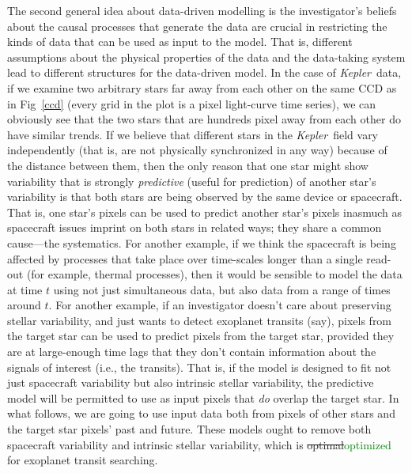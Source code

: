 \documentclass[12pt, preprint]{aastex}
\newcommand{\project}[1]{\textsl{#1}}
\newcommand{\Kepler}{\project{Kepler}}
\newcommand{\revise}[1]{\textcolor{green}{#1}}
\newcommand{\remove}[1]{\sout{#1}}
\begin{document}
The second general idea about data-driven modelling is the investigator's beliefs about the causal processes that generate the data are crucial in restricting the kinds of data that can be used as input to the model.
That is, different assumptions about the physical properties of the data and the data-taking system lead to different structures for the data-driven model.
In the case of \Kepler\ data, 
  if we examine two arbitrary stars far away from each other 
  on the same CCD as in Fig~\ref{ccd} (every grid in the plot is a pixel light-curve time series), 
  we can obviously see that the two stars that are hundreds pixel away from each other do have similar trends. 
  If we believe that different stars in the \Kepler\ field vary independently 
  (that is, are not physically synchronized in any way) because of the distance between them, 
  then the only reason that one star might show variability that is strongly \emph{predictive} (useful for prediction) of another star's variability
  is that both stars are being observed by the same device or spacecraft.
That is, one star's pixels can be used to predict another star's pixels inasmuch as spacecraft issues imprint on both stars in related ways;
  they share a common cause---the systematics.  
For another example, if we think the spacecraft is being affected by
  processes that take place over time-scales longer than a single read-out
  (for example, thermal processes),
  then it would be sensible to model the data at time $t$ using not just simultaneous data, but also data from a range of times around $t$.
For another example, if an investigator doesn't care about preserving stellar variability,
  and just wants to detect exoplanet transits (say),
  pixels from the target star can be used to predict pixels from the target star,
  provided they are at large-enough time lags that they don't contain information about
  the signals of interest (i.e., the transits).
That is, if the model is designed to fit not just spacecraft variability
  but also intrinsic stellar variability,
  the predictive model will be permitted to use as input pixels that \emph{do} overlap the target star.
In what follows, we are going to use input data both from pixels of other stars and the target star pixels' past and future.
These models ought to remove both spacecraft variability and intrinsic stellar variability, which is \remove{optimal}\revise{optimized} for exoplanet transit searching.
\end{document}
